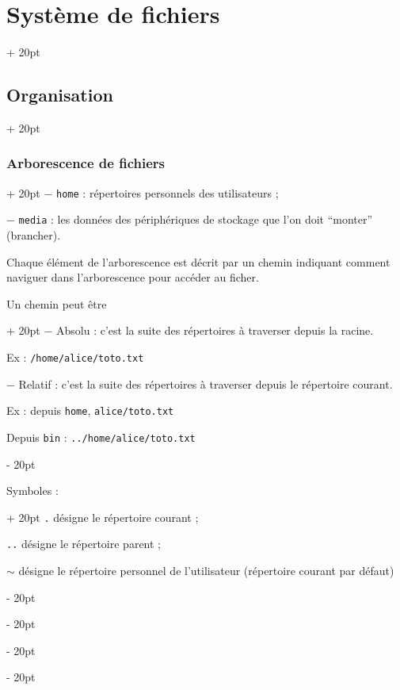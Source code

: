 \documentclass[a4paper, 12pt, twoside]{article}
\renewcommand{\emph}{\textcolor{ff4500}}
\newcommand{\ind}[1][20pt]{\advance\leftskip + #1}
\newcommand{\deind}[1][20pt]{\advance\leftskip - #1}
\newenvironment{indentedenv}[1][20pt]{\par \ind[#1]}{\par \deind}
\newenvironment{indt}[2][20pt]{#2 \begin{indentedenv}[#1]}{\end{indentedenv}} %
\begin{document}
\begin{indt}{\section{Système de fichiers}}
\begin{indt}{\subsection{Organisation}}
\begin{indt}{\subsubsection{Arborescence de fichiers}}
                $-$ \texttt{home} : répertoires personnels des utilisateurs ;
                
                $-$ \texttt{media} : les données des périphériques de stockage que l'on doit ``monter'' (brancher).
                
                \vspace{12pt}
                
                Chaque élément de l'arborescence est décrit par un chemin indiquant comment naviguer dans l'arborescence pour accéder au ficher.
                
                \vspace{12pt}
                
                \begin{indt}{Un chemin peut être}
                    $-$ \emph{Absolu} : c'est la suite des répertoires à traverser depuis la racine.
                    
                    Ex : \texttt{/home/alice/toto.txt}
                    
                    \vspace{6pt}
                    
                    $-$ \emph{Relatif} : c'est la suite des répertoires à traverser depuis le répertoire courant.
                    
                    Ex : depuis \texttt{home}, \texttt{alice/toto.txt}
                    
                    Depuis \texttt{bin} : \texttt{../home/alice/toto.txt}
                \end{indt}
                
                \vspace{12pt}
                
                \begin{indt}{Symboles :}
                    \texttt{.} désigne le répertoire courant ;
                    
                    \texttt{..} désigne le répertoire parent ;
                    
                    \texttt{$\sim$} désigne le répertoire personnel de l'utilisateur (répertoire courant par défaut)
                \end{indt}
            \end{indt}
            
            \vspace{6pt}
            

\end{indt}
\end{indt}
\end{document}
